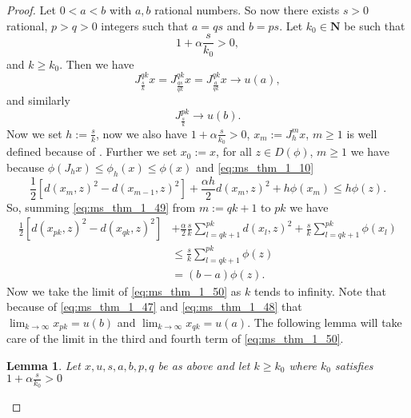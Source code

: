 \documentclass[a4paper,11pt, leqno]{scrreprt} %
\renewcommand{\leq}{\leqslant}
\renewcommand{\leq}{\leqslant}
\renewcommand{\geq}{\geqslant}
\newcommand{\N}{\mathbf N}
\theoremstyle{change}
\newcounter{acounter}[chapter]
\newtheorem{lemma}[acounter]{Lemma}
\theoremstyle{nonumberplain}
\newtheorem{proof}{Proof}
\begin{document}
\begin{proof}
  Let $0 < a < b$ with $a, b$ rational numbers. So now there exists
  $s > 0$ rational, $p > q > 0$ integers such that $a = qs$ and $b =
  ps$. Let $k_0 \in \N$ be such that
  \begin{equation}
   \label{eq:ms_thm_1_46}
    1 + \alpha \frac{s}{k_0} > 0,
  \end{equation}
  and $k \geq k_0$. Then we have
  \begin{equation}
    \label{eq:ms_thm_1_47}
    J_\frac{s}{k}^{qk} x = J_{\frac{qs}{qk}}^{qk} x =
    J_\frac{a}{qk}^{qk} x \to u(a),
  \end{equation}
  and similarly
  \begin{equation}
    \label{eq:ms_thm_1_48}
    J_\frac{s}{k}^{pk} \to u(b).
  \end{equation}
  Now we set $h := \frac{s}k$, now we also have $1 + \alpha
  \frac{s}{k_0} > 0$, $x_m := J_h^m x$, $m \geq 1$ is well defined
  because of . Further we set $x_0 := x$, for all
  $z \in D(\phi)$, $m \geq 1$ we have because $\phi(J_h x) \leq
  \phi_h(x) \leq \phi(x)$ and \eqref{eq:ms_thm_1_10}
  \begin{equation}
    \label{eq:ms_thm_1_49}
    \frac12 [d(x_m, z)^2 - d(x_{m - 1}, z)^2 ] + \frac{\alpha h}{2}
    d(x_m, z)^2 + h \phi(x_m) \leq h \phi(z).
  \end{equation}
  So, summing \eqref{eq:ms_thm_1_49} from $m := qk + 1$ to $pk$ we
  have 
  \begin{equation}
    \label{eq:ms_thm_1_50}
    \begin{split}
    \frac12 [d(x_{pk}, z)^2 - d(x_{qk}, z)^2] &+ \frac\alpha2 \frac{s}k
    \sum_{l = qk + 1}^{pk} d(x_l, z)^2 + \frac{s}k \sum_{l = qk +
      1}^{pk} \phi(x_l)\\
    &\leq \frac{s}k \sum_{l = qk + 1}^{pk} \phi(z)\\
    &=(b - a)\phi(z).
    \end{split}
  \end{equation}
  Now we take the limit of \eqref{eq:ms_thm_1_50} as $k$ tends to
  infinity. Note that because of \eqref{eq:ms_thm_1_47} and
  \eqref{eq:ms_thm_1_48} that $\lim_{k \to \infty} x_{pk} = u(b)$ and
  $\lim_{k \to \infty} x_{qk} = u(a)$. The following lemma will take
  care of the limit in the third and fourth term of
  \eqref{eq:ms_thm_1_50}.
  \begin{lemma}\label{lem:ms_lem_3}
    Let $x, u, s, a, b, p, q$ be as above and let $k \geq k_0$ where
    $k_0$ satisfies $1 + \alpha \frac{s}{k_0} > 0$
    \begin{enumerate}

\end{enumerate}
\end{lemma}
\end{proof}
\end{document}
